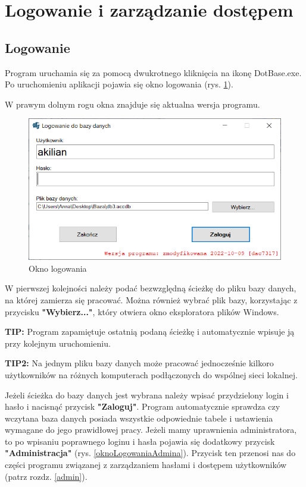 
\rozdzial

\section{Logowanie i zarządzanie dostępem}

\subsection{Logowanie}

Program uruchamia się za pomocą dwukrotnego kliknięcia na ikonę DotBase.exe.
Po uruchomieniu aplikacji pojawia się okno logowania (rys. \ref{oknoLogowania}).

W prawym dolnym rogu okna znajduje się aktualna wersja programu.

\begin{figure}[htb]
	\centering
	\includegraphics{obrazki/Logowanie/logowanie.png}
	\caption{Okno logowania}
	\label{oknoLogowania}
\end{figure}

W pierwszej kolejności należy podać bezwzględną ścieżkę do pliku bazy danych, na której zamierza się pracować. Można również wybrać plik bazy, korzystając z przycisku \textbf{"Wybierz..."}, który otwiera okno eksploratora plików Windows. 

\textbf{TIP:} Program zapamiętuje ostatnią podaną ścieżkę i automatycznie wpisuje ją przy kolejnym uruchomieniu.

\textbf{TIP2:} Na jednym pliku bazy danych może pracować jednocześnie kilkoro użytkowników na różnych komputerach podłączonych do wspólnej sieci lokalnej.

Jeżeli ścieżka do bazy danych jest wybrana należy wpisać przydzielony login i hasło i nacisnąć przycisk \textbf{"Zaloguj"}. Program automatycznie sprawdza czy wczytana baza danych posiada wszystkie odpowiednie tabele i ustawienia wymagane do jego prawidłowej pracy.
Jeżeli mamy uprawnienia administratora, to po wpisaniu poprawnego loginu i hasła pojawia się dodatkowy przycisk \textbf{"Administracja"} (rys. \ref{oknoLogowaniaAdmina}). Przycisk ten przenosi nas do części programu związanej z zarządzaniem hasłami i dostępem użytkowników (patrz rozdz. \ref{admin}).

